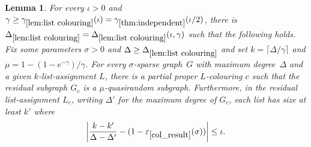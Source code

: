 \documentclass[11pt]{article}
\theoremstyle{plain}
\newtheorem{lemma}[theorem]{Lemma}
\newcommand{\eps}{\varepsilon}
\begin{document}
\begin{lemma}\label{lem:list colouring}
  For every $\iota>0$ and
  $\gamma\ge\gamma_{\ref{lem:list colouring}}(\iota)=\gamma_{\ref{thm:independent}}(\iota/2)$,
  there is $\Delta_{\ref{lem:list colouring}}=\Delta_{\ref{lem:list colouring}}(\iota,\gamma)$
  such that the following holds.
  Fix some parameters $\sigma>0$ and $\Delta \ge \Delta_{\ref{lem:list colouring}}$
  and set $k=\lceil\Delta/\gamma\rceil$ and $\mu = 1-(1-e^{-\gamma})/\gamma$.
  For every $\sigma$-sparse graph~$G$ with maximum degree~$\Delta$
  and a given $k$-list-assignment $L$, there is a partial proper
  $L$-colouring $c$ such that the residual subgraph $G_c$ is a $\mu$-quasirandom subgraph.
  Furthermore, in the residual list-assignment $L_c$, writing $\Delta'$ for the maximum degree of $G_c$, each list has size at least $k'$ where
  \[
  \left|\frac{k-k'}{\Delta - \Delta'}
  - (1 - \eps_{\ref{col_result}}(\sigma))\right|
  \leq \iota.
  \]
 \end{lemma}
\end{document}
